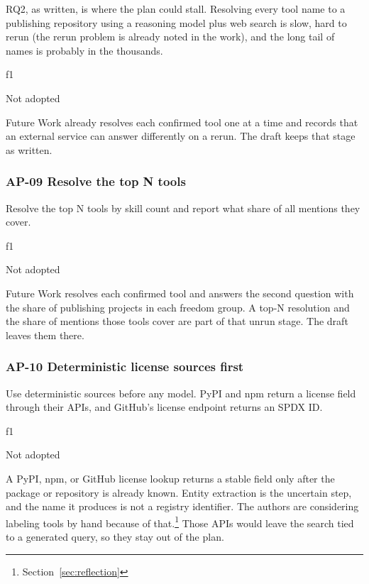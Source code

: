 \begin{description}[leftmargin=0pt]
  \item[Point] RQ2, as written, is where the plan could stall. Resolving every tool name to a publishing repository using a reasoning model plus web search is slow, hard to rerun (the rerun problem is already noted in the work), and the long tail of names is probably in the thousands.
  \item[Source] f1
  \item[Decision] Not adopted
  \item[Reasoning] Future Work already resolves each confirmed tool one at a time and records that an external service can answer differently on a rerun. The draft keeps that stage as written.
\end{description}

\subsubsection*{AP-09 Resolve the top N tools}
\label{ap:09}

\begin{description}[leftmargin=0pt]
  \item[Point] Resolve the top N tools by skill count and report what share of all mentions they cover.
  \item[Source] f1
  \item[Decision] Not adopted
  \item[Reasoning] Future Work resolves each confirmed tool and answers the second question with the share of publishing projects in each freedom group. A top-N resolution and the share of mentions those tools cover are part of that unrun stage. The draft leaves them there.
\end{description}

\subsubsection*{AP-10 Deterministic license sources first}
\label{ap:10}

\begin{description}[leftmargin=0pt]
  \item[Point] Use deterministic sources before any model. PyPI and npm return a license field through their APIs, and GitHub’s license endpoint returns an SPDX ID.
  \item[Source] f1
  \item[Decision] Not adopted
  \item[Reasoning] A PyPI, npm, or GitHub license lookup returns a stable field only after the package or repository is already known. Entity extraction is the uncertain step, and the name it produces is not a registry identifier. The authors are considering labeling tools by hand because of that.\footnote{Section~\ref{sec:reflection}} Those APIs would leave the search tied to a generated query, so they stay out of the plan.
\end{description}

